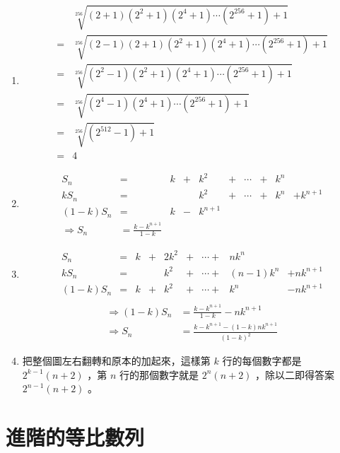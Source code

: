 \documentclass[12pt]{article}
\begin{document}
\begin{enumerate}
	\item \begin{align*}
			&\sqrt[256]{(2+1)(2^2+1)(2^4+1)\cdots(2^{256}+1)+1}\\
			= &\sqrt[256]{(2-1)(2+1)(2^2+1)(2^4+1)\cdots(2^{256}+1)+1}\\
			= &\sqrt[256]{(2^2-1)(2^2+1)(2^4+1)\cdots(2^{256}+1)+1}\\
			= &\sqrt[256]{(2^4-1)(2^4+1)\cdots(2^{256}+1)+1}\\
			= &\sqrt[256]{(2^{512}-1)+1}\\
			= & 4
		\end{align*}

	\item \begin{align*}
			    S_n  & = & k & + & k ^ 2 & + & \cdots & + & k ^ n & \\
			    kS_n & = &   &   & k ^ 2 & + & \cdots & + & k ^ n & + k ^ {n+1}\\
			(1-k)S_n & = & k & - & k ^ {n + 1}\\
			\Rightarrow S_n & = \frac{k - k ^ {n+1}}{1-k}
		\end{align*}

	\item \begin{align*}
			    S_n  & = & k & + & 2k ^ 2 & + & \cdots + & nk ^ n & \\
					kS_n & = &   &   &  k ^ 2 & + & \cdots + & (n-1)k ^ n & + nk ^ {n+1}\\
			(1-k)S_n & = & k & + &  k ^ 2 & + & \cdots + & k ^ n      & - nk ^ {n+1} \\
		\end{align*}
	\begin{align*}
		\Rightarrow (1-k)S_n & = \frac{k - k ^ {n+1}}{1-k} - nk ^ {n+1}\\
		\Rightarrow S_n & = \frac{k - k ^ {n+1} - (1-k)nk ^ {n+1}}{(1-k)^2}
		\end{align*}

	\item 把整個圖左右翻轉和原本的加起來，這樣第 $k$ 行的每個數字都是 $2 ^ {k-1} (n + 2)$ ，第 $n$ 行的那個數字就是 $2 ^ n (n + 2)$ ，除以二即得答案 $2 ^ {n-1} (n + 2)$ 。
\end{enumerate}

\pagebreak

\section{進階的等比數列}
\end{document}
